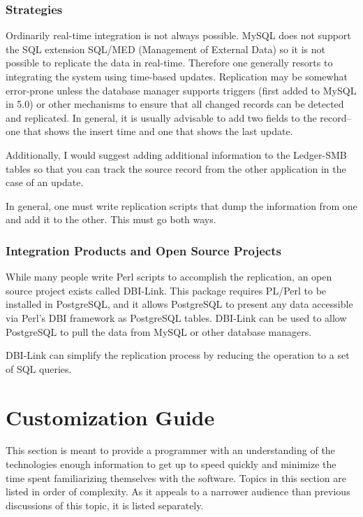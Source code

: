 \documentclass{article}
\begin{document}
\subsubsection{Strategies}
Ordinarily real-time integration is not always possible.  MySQL does not support
the SQL extension SQL/MED (Management of External Data) so it is not possible to
replicate the data in real-time.  Therefore one generally resorts to integrating
the system using time-based updates.  Replication may be somewhat error-prone
unless the database manager supports triggers (first added to MySQL in 5.0) or 
other mechanisms to ensure that
all changed records can be detected and replicated.  In general, it is usually
advisable to add two fields to the record-- one that shows the insert time and
one that shows the last update.

Additionally, I would suggest adding additional information to the Ledger-SMB
tables so that you can track the source record from the other application in the
case of an update.

In general, one must write replication scripts that dump the information from
one and add it to the other.  This must go both ways.

\subsubsection{Integration Products and Open Source Projects}
While many people write Perl scripts to accomplish the replication, an open
source project exists called DBI-Link.  This package requires PL/Perl to be
installed in PostgreSQL, and it allows PostgreSQL to present any data accessible
via Perl's DBI framework as PostgreSQL tables.  DBI-Link can be used to allow
PostgreSQL to pull the data from MySQL or other database managers.

DBI-Link can simplify the replication process by reducing the operation to a set
of SQL queries.

\section{Customization Guide}
This section is meant to provide a programmer with an understanding of the
technologies enough information to get up to speed quickly and minimize the time
spent familiarizing themselves with the software.  Topics in this section are
listed in order of complexity.  As it appeals to a narrower audience than
previous discussions of this topic, it is listed separately.
\end{document}
